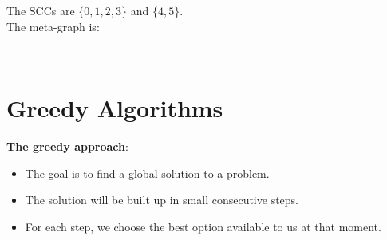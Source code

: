 \documentclass[onecolumn]{report}
\begin{document}
\noindent
The SCCs are $\{0,1,2,3\}$ and $\{4,5\}$.\\
\noindent
The meta-graph is:\\
\begin{center}
\\
\end{center}
\noindent


\chapter{Greedy Algorithms}
\textbf{The greedy approach}:
\begin{itemize}
    \item The goal is to find a global solution to a problem.
    \item The solution will be built up in small consecutive steps.
    \item For each step, we choose the best option available to us at that moment.
\end{itemize}
\end{document}

